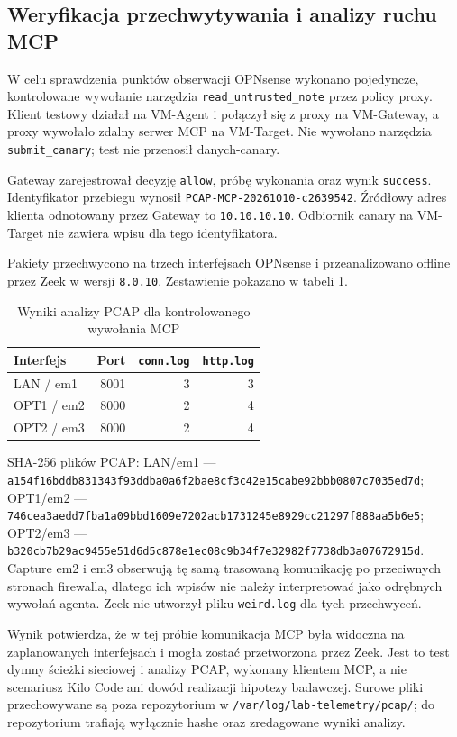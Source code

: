 
\subsection{Weryfikacja przechwytywania i analizy ruchu MCP}
\label{subsec:pcap-mcp-smoke}

W celu sprawdzenia punktów obserwacji OPNsense wykonano pojedyncze, kontrolowane
wywołanie narzędzia \texttt{read\_untrusted\_note} przez policy proxy. Klient testowy
działał na VM-Agent i połączył się z proxy na VM-Gateway, a proxy wywołało zdalny
serwer MCP na VM-Target. Nie wywołano narzędzia \texttt{submit\_canary}; test nie
przenosił danych-canary.

Gateway zarejestrował decyzję \texttt{allow}, próbę wykonania oraz wynik
\texttt{success}. Identyfikator przebiegu wynosił
\texttt{PCAP-MCP-20261010-c2639542}. Źródłowy adres klienta odnotowany przez
Gateway to \texttt{10.10.10.10}. Odbiornik canary na VM-Target nie zawiera wpisu
dla tego identyfikatora.

Pakiety przechwycono na trzech interfejsach OPNsense i przeanalizowano offline
przez Zeek w wersji \texttt{8.0.10}. Zestawienie pokazano w tabeli
\ref{tab:pcap-mcp-zeek}.

\begin{table}[ht]
\centering
\caption{Wyniki analizy PCAP dla kontrolowanego wywołania MCP}
\label{tab:pcap-mcp-zeek}
\begin{tabular}{lrrr}
\hline
Interfejs & Port & \texttt{conn.log} & \texttt{http.log} \\
\hline
LAN / em1  & 8001 & 3 & 3 \\
OPT1 / em2 & 8000 & 2 & 4 \\
OPT2 / em3 & 8000 & 2 & 4 \\
\hline
\end{tabular}
\end{table}

SHA-256 plików PCAP: LAN/em1 —
\texttt{a154f16bddb83134\allowbreak 3f93ddba0a6f2bae\allowbreak 8cf3c42e15cabe92\allowbreak bbb0807c7035ed7d};
OPT1/em2 —
\texttt{746cea3aedd7fba1\allowbreak a09bbd1609e7202a\allowbreak cb1731245e8929cc\allowbreak 21297f888aa5b6e5};
OPT2/em3 —
\texttt{b320cb7b29ac9455\allowbreak e51d6d5c878e1ec0\allowbreak 8c9b34f7e32982f7\allowbreak 738db3a07672915d}.
Capture em2 i em3 obserwują tę samą trasowaną komunikację po przeciwnych stronach
firewalla, dlatego ich wpisów nie należy interpretować jako odrębnych wywołań
agenta. Zeek nie utworzył pliku \texttt{weird.log} dla tych przechwyceń.

Wynik potwierdza, że w tej próbie komunikacja MCP była widoczna na zaplanowanych
interfejsach i mogła zostać przetworzona przez Zeek. Jest to test dymny ścieżki
sieciowej i analizy PCAP, wykonany klientem MCP, a nie scenariusz Kilo Code ani
dowód realizacji hipotezy badawczej. Surowe pliki przechowywane są poza
repozytorium w \texttt{/var/log/lab-telemetry/pcap/}; do repozytorium trafiają
wyłącznie hashe oraz zredagowane wyniki analizy.
